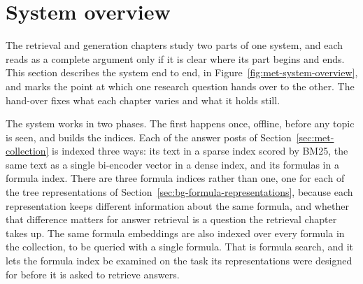 
\section{System overview}\label{sec:met-system-overview}

The retrieval and generation chapters study two parts of one system, and
each reads as a complete argument only if it is clear where its part begins and ends.
This section describes the system end to end, in Figure~\ref{fig:met-system-overview},
and marks the point at which one research question hands over to the other. The
hand-over fixes what each chapter varies and what it holds
still.

The system works in two phases. The first happens once, offline, before any topic is
seen, and builds the indices. Each of the answer posts of
Section~\ref{sec:met-collection} is indexed three ways: its text in a sparse index scored
by BM25, the same text as a single bi-encoder vector in a dense index, and its formulas
in a formula index. There are three formula indices rather than one, one for each of the
tree representations of Section~\ref{sec:bg-formula-representations}, because each
representation keeps different information about the same formula, and whether that
difference matters for answer retrieval is a question the retrieval chapter takes
up. The same formula embeddings are also indexed over every formula in the collection,
to be queried with a single formula. That is formula search, and it
lets the formula index be examined on the task its representations were designed for
before it is asked to retrieve answers.

